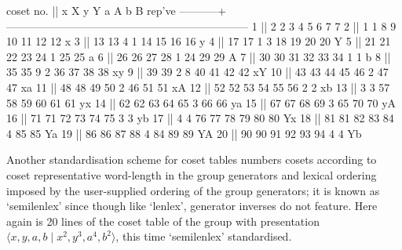 \begintt
 coset no. ||      x      X      y      Y      a      A      b      B   rep've
-----------+------------------------------------------------------------------
         1 ||      2      2      3      4      5      6      7      7
         2 ||      1      1      8      9     10     11     12     12    x
         3 ||     13     13      4      1     14     15     16     16    y
         4 ||     17     17      1      3     18     19     20     20    Y
         5 ||     21     21     22     23     24      1     25     25    a
         6 ||     26     26     27     28      1     24     29     29    A
         7 ||     30     30     31     32     33     34      1      1    b
         8 ||     35     35      9      2     36     37     38     38    xy
         9 ||     39     39      2      8     40     41     42     42    xY
        10 ||     43     43     44     45     46      2     47     47    xa
        11 ||     48     48     49     50      2     46     51     51    xA
        12 ||     52     52     53     54     55     56      2      2    xb
        13 ||      3      3     57     58     59     60     61     61    yx
        14 ||     62     62     63     64     65      3     66     66    ya
        15 ||     67     67     68     69      3     65     70     70    yA
        16 ||     71     71     72     73     74     75      3      3    yb
        17 ||      4      4     76     77     78     79     80     80    Yx
        18 ||     81     81     82     83     84      4     85     85    Ya
        19 ||     86     86     87     88      4     84     89     89    YA
        20 ||     90     90     91     92     93     94      4      4    Yb
\endtt

Another standardisation scheme for coset tables numbers cosets according to
coset representative word-length in the group generators  and  lexical
ordering  imposed  by  the  user-supplied  ordering   of   the   group
generators; it is known as `semilenlex' since  though  like  `lenlex',
generator inverses do not feature. Here again is 20 lines of the coset
table of the group with presentation $\langle x, y,  a,  b  \mid  x^2,
y^3, a^4, b^2\rangle$, this time `semilenlex' standardised.

